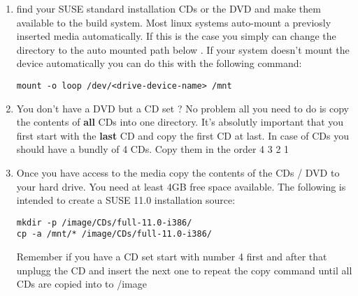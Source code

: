 \begin{enumerate}
\item find your SUSE standard installation CDs or the DVD and
      make them available to the build system. Most linux systems
      auto-mount a previosly inserted media automatically. If this
      is the case you simply can change the directory to the
      auto mounted path below . If your system doesn't mount
      the device automatically you can do this with the following
      command:

\begin{Command}{12cm}
\begin{verbatim}
mount -o loop /dev/<drive-device-name> /mnt
\end{verbatim}
\end{Command}

\item You don't have a DVD but a CD set ? No problem all you need to
      do is copy the contents of \textbf{all} CDs into one directory. It's
      absolutly important that you first start with the \textbf{last} CD and
      copy the first CD at last. In case of CDs you should have a
      bundly of 4 CDs. Copy them in the order 4 3 2 1

\item Once you have access to the media copy the contents of the
      CDs / DVD to your hard drive. You need at least 4GB free
      space available. The following is intended to create a SUSE
      11.0 installation source:

\begin{Command}{12cm}
\begin{verbatim}
mkdir -p /image/CDs/full-11.0-i386/
cp -a /mnt/* /image/CDs/full-11.0-i386/
\end{verbatim}
\end{Command}

      Remember if you have a CD set start with number 4 first and
      after that unplugg the CD and insert the next one to repeat
      the copy command until all CDs are copied into to /image
\end{enumerate}
